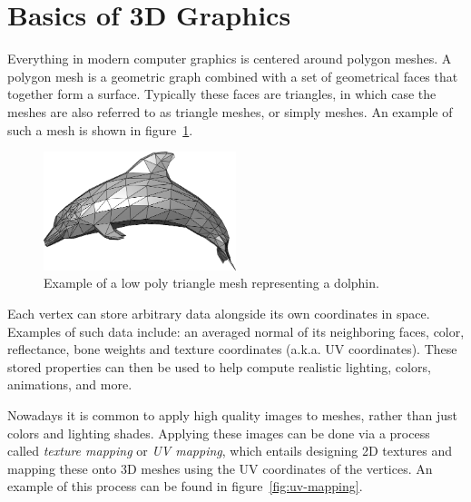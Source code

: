 \section{Basics of 3D Graphics}

Everything in modern computer graphics is centered around polygon meshes.
A polygon mesh is a geometric graph combined with a set of geometrical faces that together form a surface.
Typically these faces are triangles, in which case the meshes are also referred to as triangle meshes, or simply meshes.
An example of such a mesh is shown in figure~\ref{fig:low_poly_dolphin}.

\begin{figure}[h!]
  \centering

  \includegraphics[width=0.5\textwidth]{figure/low_poly_dolphin.png}
  \caption{Example of a low poly triangle mesh representing a dolphin. \cite{low_poly_dolphin}}

  \label{fig:low_poly_dolphin}
\end{figure}

Each vertex can store arbitrary data alongside its own coordinates in space.
Examples of such data include: an averaged normal of its neighboring faces, color, reflectance, bone weights and texture coordinates (a.k.a. UV coordinates).
These stored properties can then be used to help compute realistic lighting, colors, animations, and more.

Nowadays it is common to apply high quality images to meshes, rather than just colors and lighting shades.
Applying these images can be done via a process called \textit{texture mapping} or \textit{UV mapping}, which entails designing 2D textures and mapping these onto 3D meshes using the UV coordinates of the vertices.
An example of this process can be found in figure~\ref{fig:uv-mapping}.

